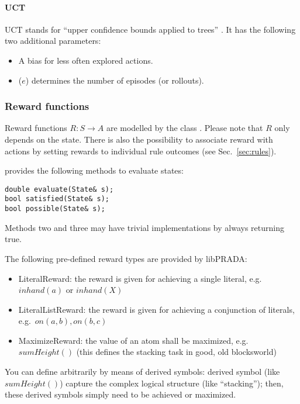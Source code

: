 \documentclass[10pt,twoside,twocolumn,fleqn]{article}
\begin{document}
\paragraph{UCT}

UCT stands for ``upper confidence bounds applied to trees''
\citep{kocsis06uct}.
It has the following two additional parameters:
\begin{itemize}
\item A bias  for less often explored actions.
\item {} ($e$) determines the number of episodes (or
rollouts).
\end{itemize}



\subsubsection{Reward functions}

Reward functions $R: S \to A$ are modelled by the class .
Please note that $R$ only depends on the state. There is also the
possibility to associate reward with actions by setting rewards to
individual rule outcomes (see Sec.~\ref{sec:rules}).

 provides the following methods to evaluate states:
\begin{lstlisting}
double evaluate(State& s);
bool satisfied(State& s);
bool possible(State& s);
\end{lstlisting}
Methods two and three may have trivial implementations by always returning
true.

The following pre-defined reward types are provided by libPRADA:
\begin{itemize}
\item LiteralReward: the reward is given for achieving a single literal,
e.g.~$inhand(a)$ or $inhand(X)$
\item LiteralListReward: the reward is given for achieving a conjunction
of literals, e.g.~$on(a,b), on(b,c)$
\item MaximizeReward: the value of an atom shall be maximized,
e.g.~$sumHeight()$ (this defines the stacking task in good, old
blocksworld)
\end{itemize}
You can define arbitrarily  by
means of derived symbols: derived symbol (like $sumHeight()$) capture
the complex logical structure (like ``stacking''); then, these derived
symbols simply need to be achieved or maximized.
\end{document}
